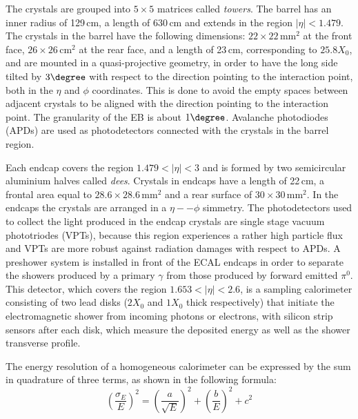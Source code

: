 The crystals are grouped into $5\times5$ matrices called \emph{towers}. The barrel has an inner radius of 129\,cm, a length of 630\,cm and extends in the region $|\eta|<1.479$. The crystals in the barrel have the following dimensions: $22\times22\,\mathrm{mm^2}$ at the front face, $26\times26\,\mathrm{cm^2}$ at the rear face, and a length of 23\,cm, corresponding to $25.8 X_0$, and are mounted in a quasi-projective geometry, in order to have the long side tilted by $3\degree$ with respect to the direction pointing to the interaction point, both in the $\eta$ and $\phi$ coordinates. This is done to avoid the empty spaces between adjacent crystals to be aligned with the direction pointing to the interaction point. The granularity of the EB is about $1\degree$.
Avalanche photodiodes (APDs) are used as photodetectors connected with the crystals in the barrel region.

Each endcap covers the region $1.479 < |\eta| < 3$ and is formed by two semicircular aluminium halves called \emph{dees}. Crystals in endcaps have a length of 22\,cm, a frontal area equal to $28.6\times 28.6\,\mathrm{mm^2}$ and a rear surface of $30\times 30\,\mathrm{mm^2}$. In the endcaps the crystals are arranged in a $\eta -- \phi$ simmetry. The photodetectors used to collect the light produced in the endcap crystals are single stage vacuum phototriodes (VPTs), because this region experiences a rather high particle flux and VPTs are more robust against radiation damages with respect to APDs. A preshower system is installed in front of the ECAL endcaps in order to separate the showers produced by a primary $\gamma$ from those produced by forward emitted $\pi^0$. This detector, which covers the region $1.653<|\eta|<2.6$, is a sampling calorimeter consisting of two lead disks ($2 X_0$ and $1 X_0$ thick respectively) that initiate the electromagnetic shower from incoming photons or electrons, with silicon strip sensors after each disk, which measure the deposited energy as well as the shower transverse profile.

The energy resolution of a homogeneous calorimeter can be expressed by the sum in quadrature of three terms, as shown in the following formula:
\begin{equation}
\left(\frac{\sigma_E}{E}\right)^2 = \left(\frac{a}{\sqrt{E}}\right)^2 + \left(\frac{b}{E}\right)^2 + c^2
\end{equation}

